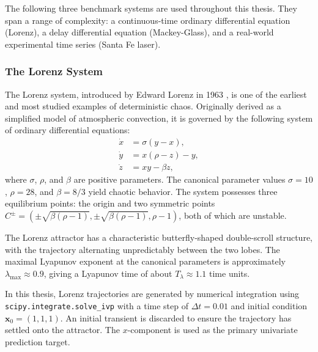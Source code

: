 The following three benchmark systems are used throughout this thesis. They span a range of complexity: a continuous-time ordinary differential equation (Lorenz), a delay differential equation (Mackey-Glass), and a real-world experimental time series (Santa Fe laser).

\subsubsection{The Lorenz System}
\label{sec:lorenz}

The Lorenz system, introduced by Edward Lorenz in 1963 \cite{lorenz1963deterministic}, is one of the earliest and most studied examples of deterministic chaos. Originally derived as a simplified model of atmospheric convection, it is governed by the following system of ordinary differential equations:
\begin{align}
    \dot{x} &= \sigma(y - x), \label{eq:lorenz_x} \\
    \dot{y} &= x(\rho - z) - y, \label{eq:lorenz_y} \\
    \dot{z} &= xy - \beta z, \label{eq:lorenz_z}
\end{align}
where $\sigma$, $\rho$, and $\beta$ are positive parameters. The canonical parameter values $\sigma = 10$, $\rho = 28$, and $\beta = 8/3$ yield chaotic behavior. The system possesses three equilibrium points: the origin and two symmetric points $C^\pm = (\pm\sqrt{\beta(\rho-1)}, \pm\sqrt{\beta(\rho-1)}, \rho-1)$, both of which are unstable.

The Lorenz attractor has a characteristic butterfly-shaped double-scroll structure, with the trajectory alternating unpredictably between the two lobes. The maximal Lyapunov exponent at the canonical parameters is approximately $\lambda_{\max} \approx 0.9$, giving a Lyapunov time of about $T_\lambda \approx 1.1$ time units.

In this thesis, Lorenz trajectories are generated by numerical integration using \texttt{scipy.integrate.solve\_ivp} with a time step of $\Delta t = 0.01$ and initial condition $\mathbf{x}_0 = (1, 1, 1)$. An initial transient is discarded to ensure the trajectory has settled onto the attractor. The $x$-component is used as the primary univariate prediction target.

